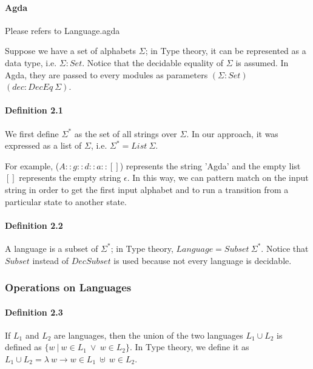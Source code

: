 \documentclass[twoside,openright,final]{bhamthesis}
\begin{document}
\paragraph{Agda} Please refers to Language.agda \\

\par Suppose we have a set of alphabets \(\Sigma\); in Type theory, it
can be represented as a data type, i.e. \(\Sigma : Set\). Notice that the decidable equality of
\(\Sigma\) is assumed. In Agda, they are passed to every modules as
parameters \((\Sigma : Set)\) \((dec : DecEq\ \Sigma)\). 

\paragraph{Definition 2.1} We first define \(\Sigma^*\) as the set of all
strings over \(\Sigma\). In our approach, it was expressed as a list of
\(\Sigma\), i.e. \(\Sigma^* = List\ \Sigma\). \\ 

\par For example, (\(A :: g ::
d :: a :: []\)) represents the string 'Agda' and the empty list \([]\)
represents the empty string \(\epsilon\). In this way, we can pattern
match on the input string in order to get the first
input alphabet and to run a transition from a particular state to another state. 

\paragraph{Definition 2.2} A language is a subset of 
\(\Sigma^*\); in Type theory, \(Language = Subset\ \Sigma^*\). 
Notice that \(Subset\) instead of \(DecSubset\) is used because not every language is decidable. 

\subsubsection{Operations on Languages}

\paragraph{Definition 2.3} If \(L_1\) and \(L_2\) are languages, then
the union of the two languages \(L_1\cup L_2\) is defined as \(\{w\
|\  w \in L_1\ \vee \ w \in
L_2\}\). In Type theory, we define it as \(L_1 \cup L_2 = \lambda\ w
\to w \in L_1\ \uplus\ w \in L_2\).
\end{document}
